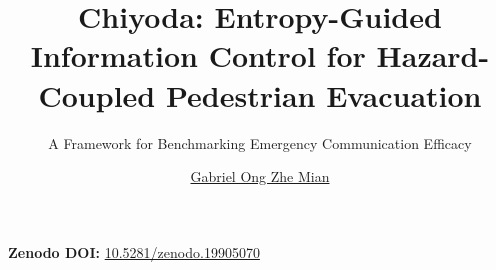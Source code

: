 \documentclass[sigconf,nonacm,screen]{acmart}
\title{Chiyoda: Entropy-Guided Information Control for Hazard-Coupled Pedestrian Evacuation}
\subtitle{A Framework for Benchmarking Emergency Communication Efficacy}
\author{\href{https://gabrielongzm.com}{Gabriel Ong Zhe Mian}}
\affiliation{%
  \institution{Independent}
  \country{Singapore}
}
\begin{document}
\maketitle
\noindent\textbf{Zenodo DOI:} \href{https://doi.org/10.5281/zenodo.19905070}{10.5281/zenodo.19905070}














\end{document}
